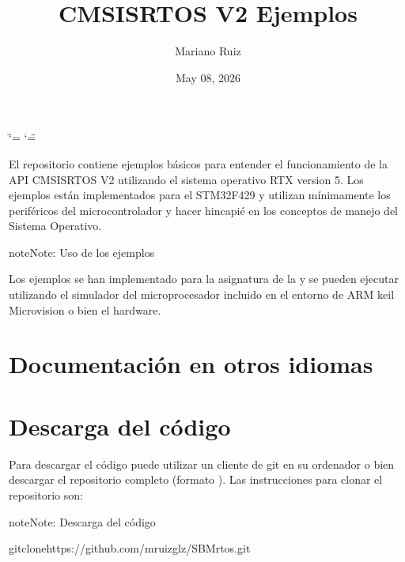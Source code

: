 \documentclass[letterpaper,10pt,english]{sphinxmanual}
\title{CMSIS\sphinxhyphen{}RTOS V2 Ejemplos}
\date{May 08, 2026}
\author{Mariano Ruiz}
\begin{document}
\ifdefined\shorthandoff
  \ifnum\catcode`\=\string=\active\shorthandoff{=}\fi
  \ifnum\catcode`\"=\active{}\fi
\fi

\pagestyle{empty}
\sphinxmaketitle
\pagestyle{plain}
\sphinxtableofcontents
\pagestyle{normal}
\label{\detokenize{index::doc}}
\sphinxstepscope



\sphinxAtStartPar
El repositorio contiene ejemplos básicos para entender el funcionamiento de la API CMSIS\sphinxhyphen{}RTOS V2 utilizando el sistema operativo RTX version 5. Los ejemplos están implementados para el STM32F429 y utilizan mínimamente los periféricos del microcontrolador y hacer hincapié en los conceptos de manejo del Sistema Operativo.

\begin{sphinxadmonition}{note}{Note:}
\sphinxAtStartPar
Uso de los ejemplos

\sphinxAtStartPar
Los ejemplos se han implementado para la asignatura  de la  y se pueden ejecutar utilizando el simulador del microprocesador incluido en el entorno de ARM keil Microvision o bien el hardware.
\end{sphinxadmonition}


\chapter{Documentación en otros idiomas}
\label{\detokenize{cmsis-rtos:documentacion-en-otros-idiomas}}
\sphinxAtStartPar
{}


\chapter{Descarga del código}
\label{\detokenize{cmsis-rtos:descarga-del-codigo}}
\sphinxAtStartPar
Para descargar el código puede utilizar un cliente de git en su ordenador o bien descargar el repositorio completo (formato ). Las instrucciones para clonar el repositorio son:

\begin{sphinxadmonition}{note}{Note:}
\sphinxAtStartPar
Descarga del código

\begin{sphinxVerbatim}[commandchars=\\\{\}]
\PYGZdl{}gitclonehttps://github.com/mruizglz/SBM\PYGZhy{}rtos.git
\end{sphinxVerbatim}
\end{sphinxadmonition}
\end{document}
